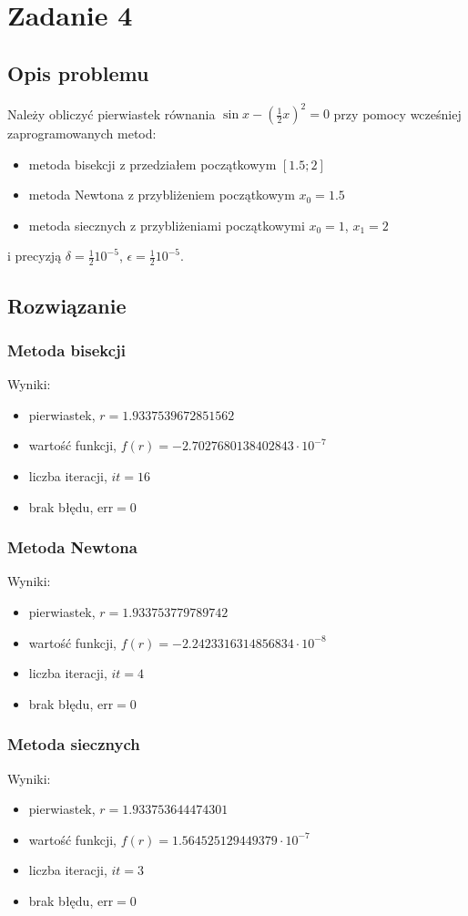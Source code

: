 \documentclass{article}
\begin{document}
\section*{Zadanie 4}
\subsection*{Opis problemu}
	Należy obliczyć pierwiastek równania $\sin x - \left(\frac{1}{2} x\right)^2 = 0$ przy pomocy wcześniej zaprogramowanych metod:
	\begin{itemize}
	    \item metoda bisekcji z przedziałem początkowym $[1.5;2]$
	    \item metoda Newtona z przybliżeniem początkowym $x_0 = 1.5$
	    \item metoda siecznych z przybliżeniami początkowymi $x_0 = 1$, $x_1 = 2$
	\end{itemize}
\noindent i precyzją $\delta = \frac{1}{2} 10^{-5}$, $\epsilon = \frac{1}{2} 10^{-5}$.
\subsection*{Rozwiązanie}
\subsubsection*{Metoda bisekcji}
	\noindent Wyniki:
		\begin{itemize}
			\item pierwiastek, $r = 1.9337539672851562$
		    \item wartość funkcji, $f(r) = -2.7027680138402843 \cdot 10^{-7}$
		    \item liczba iteracji, $it = 16$
		    \item brak błędu, $\mathrm{err} = 0$
		\end{itemize}
\subsubsection*{Metoda Newtona}
	\noindent Wyniki:
		\begin{itemize}
			\item pierwiastek, $r = 1.933753779789742$
		    \item wartość funkcji, $f(r) = -2.2423316314856834 \cdot 10^{-8}$
		    \item liczba iteracji, $it = 4$
		    \item brak błędu, $\mathrm{err} = 0$
		\end{itemize}
\subsubsection*{Metoda siecznych}
	\noindent Wyniki:
		\begin{itemize}
			\item pierwiastek, $r = 1.933753644474301$
		    \item wartość funkcji, $f(r) = 1.564525129449379 \cdot 10^{-7}$
		    \item liczba iteracji, $it = 3$
		    \item brak błędu, $\mathrm{err} = 0$
		\end{itemize}
\end{document}
